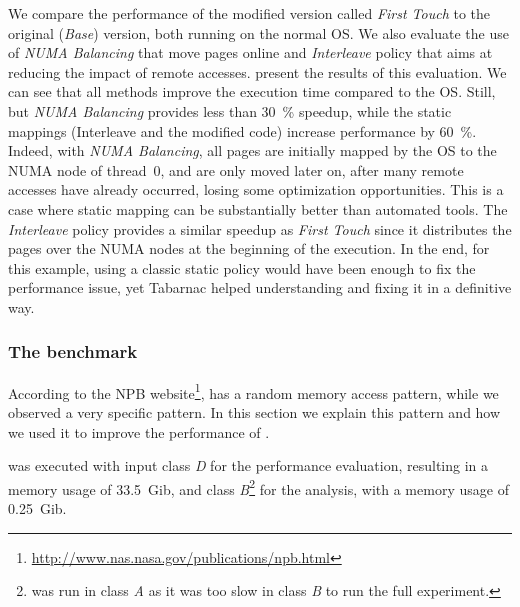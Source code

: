 We compare the performance of the modified version called \emph{First Touch} to the original (\emph{Base}) version, both running on the normal OS.
We also evaluate the use of \emph{NUMA Balancing} that move pages online and \emph{Interleave} policy that aims at reducing the impact of remote accesses.
 present the results of this evaluation.
We can see that all methods improve the execution time compared to the \gls{OS}.
Still, but \emph{NUMA Balancing} provides less than \SI{30}{\%} speedup, while the static mappings (Interleave and the modified code) increase performance by \SI{60}{\%}.
Indeed, with \emph{NUMA Balancing}, all pages are initially mapped by the \gls{OS} to the \gls{NUMA} node of thread~$0$, and are only moved later on, after many remote accesses have already occurred, losing some optimization opportunities.
This is a case where static mapping can be substantially better than automated tools.
The \emph{Interleave} policy provides a similar speedup as \emph{First Touch} since it distributes the pages over the \gls{NUMA} nodes at the beginning of the execution.
In the end, for this example, using a classic static policy would have been enough to fix the performance issue, yet \gls{Tabarnac} helped understanding and fixing it in a definitive way.

\subsubsection{The \IS benchmark}


According to the \gls{NPB} website\footnote{\url{http://www.nas.nasa.gov/publications/npb.html}}, \IS has a random memory access pattern, while we observed a very specific pattern.
In this section we explain this pattern and how we used it to improve the performance of \IS.

\IS was executed with input class \emph{D} for the performance evaluation, resulting in a memory usage of \SI{33.5}{Gib}, and class \emph{B}\footnote{
    \DC was run in class \emph{A} as it was too slow in class \emph{B} to run the full experiment.}
    for the analysis, with a memory usage of \SI{0.25}{Gib}.

